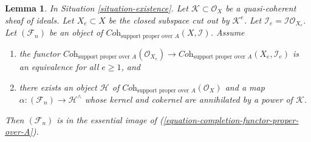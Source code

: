 \documentclass[10pt,a4paper]{amsart}
\theoremstyle{plain}
\newtheorem{lemma}[subsection]{Lemma}
\theoremstyle{definition}
\theoremstyle{remark}
\numberwithin{equation}{subsection}
\begin{document}
\begin{lemma}
\label{lemma-existence-tricky}
In Situation \ref{situation-existence}. Let $\mathcal{K} \subset \mathcal{O}_X$
be a quasi-coherent sheaf of ideals. Let $X_e \subset X$ be the closed subspace
cut out by $\mathcal{K}^e$. Let $\mathcal{I}_e = \mathcal{I}\mathcal{O}_{X_e}$.
Let $(\mathcal{F}_n)$ be an object of
$\textit{Coh}_{\text{support proper over } A}(X, \mathcal{I})$.
Assume
\begin{enumerate}
\item the functor
$\textit{Coh}_{\text{support proper over } A}(\mathcal{O}_{X_e})
\to \textit{Coh}_{\text{support proper over } A}(X_e, \mathcal{I}_e)$
is an equivalence for all $e \geq 1$, and
\item there exists an object $\mathcal{H}$ of
$\textit{Coh}_{\text{support proper over } A}(\mathcal{O}_X)$ and a map
$\alpha : (\mathcal{F}_n) \to \mathcal{H}^\wedge$ whose
kernel and cokernel are annihilated by a power of $\mathcal{K}$.
\end{enumerate}
Then $(\mathcal{F}_n)$ is in the essential image of
(\ref{equation-completion-functor-proper-over-A}).
\end{lemma}
\end{document}
